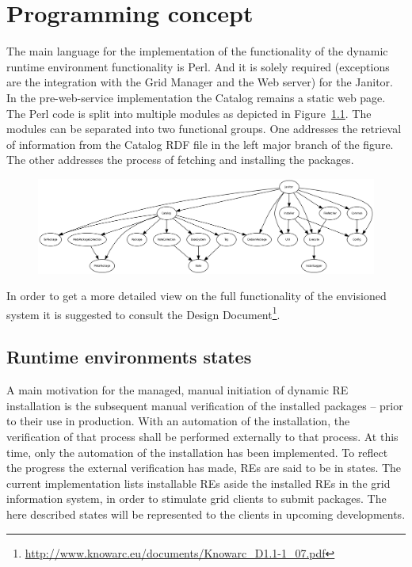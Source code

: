 \chapter{Programming concept}

 The main language for the implementation of the functionality of the
 dynamic runtime environment functionality is Perl. And it is solely required (exceptions are the
 integration with the Grid Manager and the Web server) for the Janitor. In
 the pre-web-service implementation the Catalog remains a static web page.
 The Perl code is split into multiple modules as depicted in Figure~\ref{fig:janitorDependencies}. 
 The modules can be separated into two
 functional groups. One addresses the retrieval of information from
 the Catalog RDF file in the left major branch of the figure. The other
 addresses the process of fetching and installing the packages.

 \begin{landscape}
\begin{figure}[!h]
\vspace{4cm}
 \begin{center} 
    \includegraphics[width=24cm]{images/dependencies.png}
 \end{center} 
\vfill
 \label{fig:janitorDependencies} 
\end{figure}
 \end{landscape}

In order to get a more detailed view on the full functionality of the envisioned system it is suggested to consult the 
Design Document\footnote{\href{http://www.knowarc.eu/documents/Knowarc_D1.1-1_07.pdf}
{http://www.knowarc.eu/documents/Knowarc\_D1.1-1\_07.pdf}}.




\section{Runtime environments states}
A main motivation for the managed, manual initiation of dynamic RE
installation is the subsequent manual verification of the installed
packages -- prior to their use in production.
With an automation of the installation, the verification of
that process shall be performed externally to that process.  At this
time, only the automation of the installation has been implemented.
To reflect the progress the external verification has made, REs
are said to be in states. The current implementation lists
installable REs aside the installed REs in the grid information system,
in order to stimulate grid clients to submit packages. The here described
states will be represented to the clients in upcoming developments.


